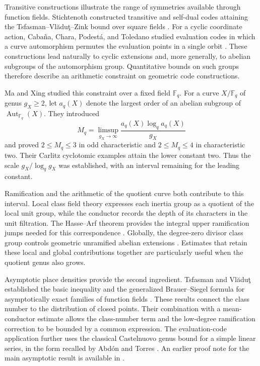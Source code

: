 \documentclass[12pt,onecolumn,draftclsnofoot,letterpaper]{IEEEtran}
\theoremstyle{remark}
\newcommand{\F}{\mathbb F}
\newcommand{\Aut}{\operatorname{Aut}}
\begin{document}
Transitive constructions illustrate the range of symmetries available through function fields. Stichtenoth constructed transitive and self-dual codes attaining the Tsfasman--Vl\u{a}du\c{t}--Zink bound over square fields \cite{transitive}. For a cyclic coordinate action, Caba\~na, Chara, Podest\'a, and Toledano studied evaluation codes in which a curve automorphism permutes the evaluation points in a single orbit \cite{cabana}. These constructions lead naturally to cyclic extensions and, more generally, to abelian subgroups of the automorphism group. Quantitative bounds on such groups therefore describe an arithmetic constraint on geometric code constructions.

Ma and Xing \cite{maxing} studied this constraint over a fixed field $\F_q$. For a curve $X/\F_q$ of genus $g_X\ge2$, let $a_q(X)$ denote the largest order of an abelian subgroup of $\Aut_{\F_q}(X)$. They introduced
\begin{equation}
 M_q=\limsup_{g_X\to\infty}
 \frac{a_q(X)\log_q a_q(X)}{g_X}
 \label{eq:introMq}
\end{equation}
and proved $2\le M_q\le3$ in odd characteristic and $2\le M_q\le4$ in characteristic two. Their Carlitz cyclotomic examples attain the lower constant two. Thus the scale $g_X/\log_q g_X$ was established, with an interval remaining for the leading constant.

Ramification and the arithmetic of the quotient curve both contribute to this interval. Local class field theory expresses each inertia group as a quotient of the local unit group, while the conductor records the depth of its characters in the unit filtration. The Hasse--Arf theorem provides the integral upper ramification jumps needed for this correspondence \cite{yoshida,li}. Globally, the degree-zero divisor class group controls geometric unramified abelian extensions \cite{genus}. Estimates that retain these local and global contributions together are particularly useful when the quotient genus also grows.

Asymptotic place densities provide the second ingredient. Tsfasman and Vl\u{a}du\c{t} established the basic inequality and the generalized Brauer--Siegel formula for asymptotically exact families of function fields \cite{tv}. These results connect the class number to the distribution of closed points. Their combination with a mean-conductor estimate allows the class-number term and the low-degree ramification correction to be bounded by a common expression. The evaluation-code application further uses the classical Castelnuovo genus bound for a simple linear series, in the form recalled by Abd\'on and Torres \cite{abdon}. An earlier proof note for the main asymptotic result is available in \cite{note}.
\end{document}
